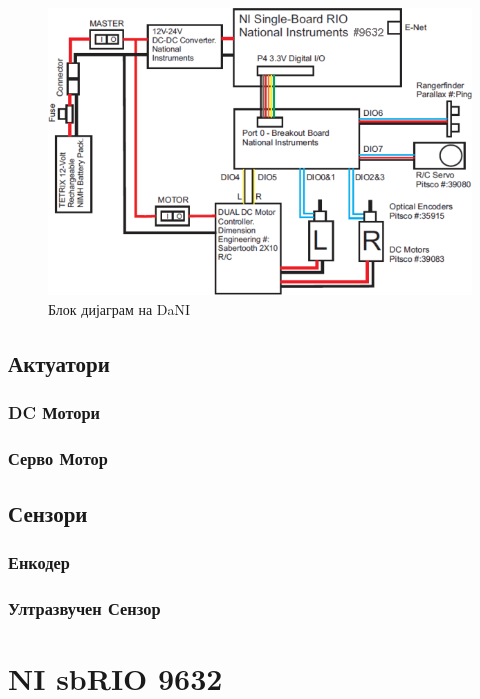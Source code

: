 \documentclass{article}
\begin{document}
\begin{figure}[h]
\includegraphics[width=0.75\linewidth]{dani_block_diagram.png}
\centering
\caption{Блок дијаграм на DaNI}
\label{fig:dani_block_diagram.png}
\end{figure}

\subsection{Актуатори}
\subsubsection{DC Мотори}
\subsubsection{Серво Мотор}
\subsection{Сензори}
\subsubsection{Енкодер}
\subsubsection{Ултразвучен Сензор}

\section{NI sbRIO 9632}
\end{document}
